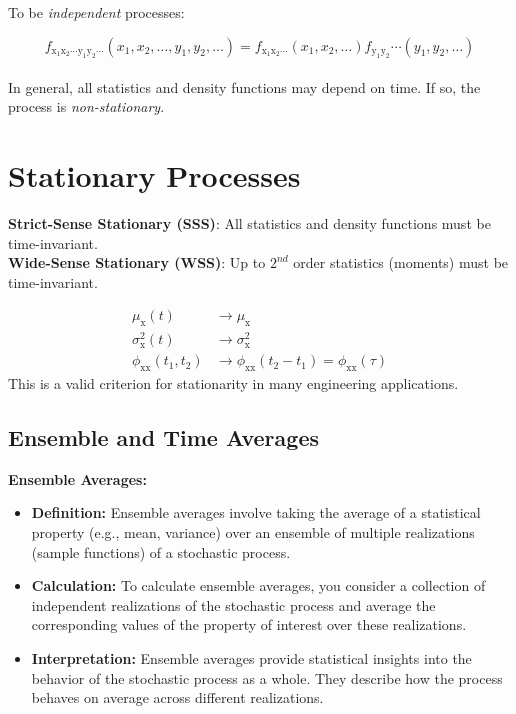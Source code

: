 \documentclass[12pt]{book}
\theoremstyle{definition}
\begin{document}
To be \emph{independent} processes:

\[
f_\mathrm{x_1 x_2 \cdots y_1 y_2 \cdots}(x_1, x_2, \ldots, y_1, y_2, \ldots) = f_\mathrm{x_1 x_2 \cdots}(x_1, x_2, \ldots) f_\mathrm{y_1 y_2} \cdots(y_1, y_2, \ldots)
\]\\

In general, all statistics and density functions may depend on time. If so, the process is \emph{non-stationary}.

\section{Stationary Processes}

\textbf{Strict-Sense Stationary (SSS)}: All statistics and density functions must be time-invariant.\\

\textbf{Wide-Sense Stationary (WSS)}: Up to \(2^{nd}\) order statistics (moments) must be time-invariant.

\[
\begin{split}
\mu_\mathrm{x}(t) & \rightarrow \mu_\mathrm{x} \\
\sigma_\mathrm{x}^2(t) & \rightarrow \sigma_\mathrm{x}^2 \\
\phi_\mathrm{xx}(t_1,t_2) & \rightarrow \phi_\mathrm{xx}(t_2-t_1) = \phi_\mathrm{xx}(\tau)
\end{split}
\]
This is a valid criterion for stationarity in many engineering applications.

\subsection{Ensemble  and Time Averages}
\textbf{Ensemble Averages:}

\begin{itemize}
    \item \textbf{Definition:} Ensemble averages involve taking the average of a statistical property (e.g., mean, variance) over an ensemble of multiple realizations (sample functions) of a stochastic process.
    \item \textbf{Calculation:} To calculate ensemble averages, you consider a collection of independent realizations of the stochastic process and average the corresponding values of the property of interest over these realizations.
    \item \textbf{Interpretation:} Ensemble averages provide statistical insights into the behavior of the stochastic process as a whole. They describe how the process behaves on average across different realizations.
\end{itemize}
\end{document}
